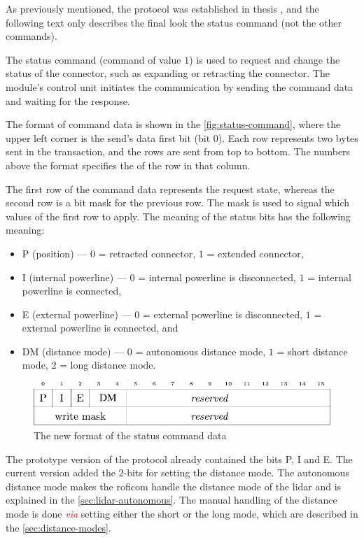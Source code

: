 \documentclass[
  digital,     %
  oneside,     %
  nosansbold,  %
  nocolorbold, %
  nolof,         %
  nolot,         %
]{fithesis4}
\newcommand{\TODO}[1]{\textcolor{red}{\textit{#1}}}
\begin{document}
{{{As previously mentioned, the protocol was established in thesis \cite[p.~19--22]{Mrazek2019thesis}, and the following text only describes the final look the status command (not the other commands).

The status command (command of value $1$) is used to request and change the status of the connector, such as expanding or retracting the connector. The module's control unit initiates the communication by sending the command data and waiting for the response.

The format of command data is shown in the \autoref{fig:status-command}, where the upper left corner is the send's data first bit (bit $0$). Each row represents two bytes sent in the transaction, and the rows are sent from top to bottom. The numbers above the format specifies the of the row in that column.

The first row of the command data represents the request state, whereas the second row is a bit mask for the previous row. The mask is used to signal which values of the first row to apply. The meaning of the status bits has the following meaning:

\begin{itemize}
    \item P (position) --- $0$ = retracted connector, $1$ = extended connector,
    \item I (internal powerline) --- $0$ = internal powerline is disconnected, $1$ = internal powerline is connected,
    \item E (external powerline) --- $0$ = external powerline is disconnected, $1$ = external powerline is connected, and
    \item DM (distance mode) --- $0$ = autonomous distance mode, $1$ = short distance mode, $2$ = long distance mode. 
\end{itemize}

\begin{figure}
    \includegraphics[width=\textwidth,height=\textheight,keepaspectratio]{assets/status_command_new.pdf}
    \caption[Status command data]{The new format of the status command data}
    \label{fig:status-command}
\end{figure}

The prototype version of the protocol already contained the bits P, I and E. The current version added the 2-bits for setting the distance mode. The autonomous distance mode makes the \acrshort{roficom} handle the distance mode of the \acrshort{lidar} and is explained in the \autoref{sec:lidar-autonomous}. The manual handling of the distance mode is done \TODO{via} setting either the short or the long mode, which are described in the \autoref{sec:distance-modes}.

}}}
\end{document}
